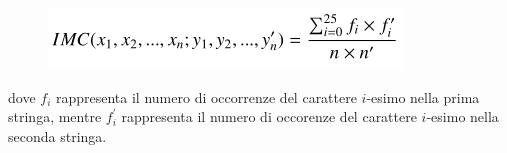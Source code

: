 \begin{figure}[H]
    \centering
    \includegraphics[width=0.6\linewidth]{chapters/chap3/images/pic3.png}
\end{figure}

\noindent dove $f_i$ rappresenta il numero di occorrenze del carattere $i$-esimo nella prima stringa, mentre $f_i^{'}$ rappresenta il numero di occorenze del 
carattere $i$-esimo nella seconda stringa.












